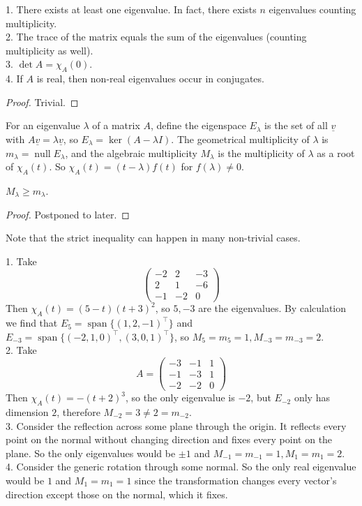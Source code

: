 \begin{proposition}
    1. There exists at least one eigenvalue.
    In fact, there exists $n$ eigenvalues counting multiplicity.\\
    2. The trace of the matrix equals the sum of the eigenvalues (counting multiplicity as well).\\
    3. $\det A=\chi_A(0)$.\\
    4. If $A$ is real, then non-real eigenvalues occur in conjugates.
\end{proposition}
\begin{proof}
    Trivial.
\end{proof}
\begin{definition}
    For an eigenvalue $\lambda$ of a matrix $A$, define the eigenspace $E_\lambda$ is the set of all $\underline{v}$ with $A\underline{v}=\lambda\underline{v}$, so $E_\lambda=\ker(A-\lambda I)$.
    The geometrical multiplicity of $\lambda$ is $m_\lambda=\operatorname{null}E_\lambda$, and the algebraic multiplicity $M_\lambda$ is the multiplicity of $\lambda$ as a root of $\chi_A(t)$.
    So $\chi_A(t)=(t-\lambda)f(t)$ for $f(\lambda)\neq 0$.
\end{definition}
\begin{proposition}\label{alg_ge_geom}
    $M_\lambda\ge m_\lambda$.
\end{proposition}
\begin{proof}
    Postponed to later.
\end{proof}
Note that the strict inequality can happen in many non-trivial cases.
\begin{example}
    1. Take
    $$\begin{pmatrix}
        -2&2&-3\\
        2&1&-6\\
        -1&-2&0
    \end{pmatrix}$$
    Then $\chi_A(t)=(5-t)(t+3)^2$, so $5,-3$ are the eigenvalues.
    By calculation we find that $E_5=\operatorname{span}\{(1,2,-1)^\top\}$ and $E_{-3}=\operatorname{span}\{(-2,1,0)^\top,(3,0,1)^\top\}$, so $M_5=m_5=1,M_{-3}=m_{-3}=2$.\\
    2. Take
    $$A=\begin{pmatrix}
        -3&-1&1\\
        -1&-3&1\\
        -2&-2&0
    \end{pmatrix}$$
    Then $\chi_A(t)=-(t+2)^3$, so the only eigenvalue is $-2$, but $E_{-2}$ only has dimension $2$, therefore $M_{-2}=3\neq 2=m_{-2}$.\\
    3. Consider the reflection across some plane through the origin.
    It reflects every point on the normal without changing direction and fixes every point on the plane.
    So the only eigenvalues would be $\pm 1$ and $M_{-1}=m_{-1}=1,M_1=m_1=2$.\\
    4. Consider the generic rotation through some normal.
    So the only real eigenvalue would be $1$ and $M_1=m_1=1$ since the transformation changes every vector's direction except those on the normal, which it fixes.
\end{example}
